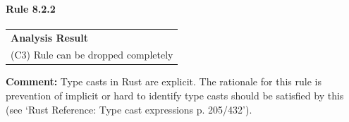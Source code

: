 \paragraph{Rule 8.2.2}
\begin{longtable}{p{13cm}}
\textbf{Analysis Result} \\
(C3) Rule can be dropped completely \\
\end{longtable}
\textbf{Comment:} Type casts in Rust are explicit. The rationale for this rule is prevention of implicit or hard to identify type casts should be satisfied by this (see `Rust Reference: Type cast expressions p. 205/432'). \\
